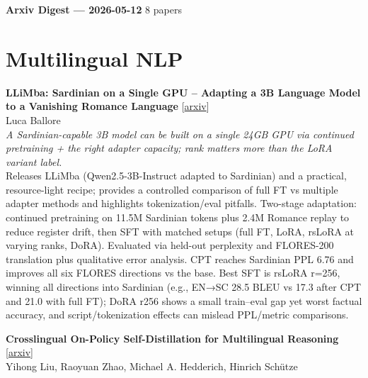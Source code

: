 \documentclass[12pt,letterpaper]{article}
\begin{document}
{\footnotesize\textbf{Arxiv Digest --- 2026-05-12} \hfill 8 papers}

\smallskip

\section*{Multilingual NLP}

{\small\textbf{LLiMba: Sardinian on a Single GPU -- Adapting a 3B Language Model to a Vanishing Romance Language}} {\scriptsize[\href{https://arxiv.org/abs/2605.09015}{arxiv}]}\\
{\scriptsize Luca Ballore}\\

{\small\textit{A Sardinian-capable 3B model can be built on a single 24GB GPU via continued pretraining + the right adapter capacity; rank matters more than the LoRA variant label.}}\\[1pt]
{\footnotesize Releases LLiMba (Qwen2.5-3B-Instruct adapted to Sardinian) and a practical, resource-light recipe; provides a controlled comparison of full FT vs multiple adapter methods and highlights tokenization/eval pitfalls. Two-stage adaptation: continued pretraining on 11.5M Sardinian tokens plus 2.4M Romance replay to reduce register drift, then SFT with matched setups (full FT, LoRA, rsLoRA at varying ranks, DoRA). Evaluated via held-out perplexity and FLORES-200 translation plus qualitative error analysis. CPT reaches Sardinian PPL 6.76 and improves all six FLORES directions vs the base. Best SFT is rsLoRA r=256, winning all directions into Sardinian (e.g., EN→SC 28.5 BLEU vs 17.3 after CPT and 21.0 with full FT); DoRA r256 shows a small train--eval gap yet worst factual accuracy, and script/tokenization effects can mislead PPL/metric comparisons.}

\medskip

{\small\textbf{Crosslingual On-Policy Self-Distillation for Multilingual Reasoning}} {\scriptsize[\href{https://arxiv.org/abs/2605.09548}{arxiv}]}\\
{\scriptsize Yihong Liu, Raoyuan Zhao, Michael A. Hedderich, Hinrich Sch\"utze}\\
\end{document}
